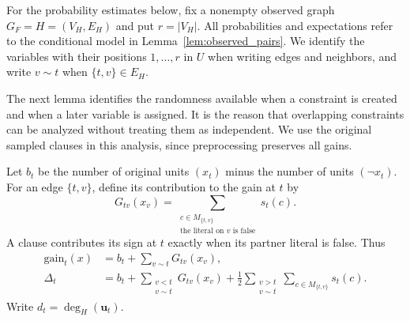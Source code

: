 \documentclass[11pt,a4paper]{article}
\theoremstyle{definition}
\theoremstyle{remark}
\begin{document}
For the probability estimates below, fix a nonempty observed graph
$G_F=H=(V_H,E_H)$ and put $r=|V_H|$. All probabilities and expectations
refer to the conditional model in Lemma~\ref{lem:observed_pairs}.
We identify the variables with their positions $1,\ldots,r$ in $U$
when writing edges and neighbors, and write $v\sim t$ when
$\{t,v\}\in E_H$.

The next lemma identifies the randomness available when a constraint is
created and when a later variable is assigned. It is the reason that
overlapping constraints can be analyzed without treating them as
independent. We use the original sampled clauses in this analysis, since
preprocessing preserves all gains.

Let $b_t$ be the number of original units $(x_t)$ minus the number of
units $(\neg x_t)$. For an edge $\{t,v\}$, define its contribution to
the gain at $t$ by
\[
 G_{tv}(x_v)=
 \sum_{\substack{c\in M_{\{t,v\}}\\
                 \text{the literal on }v\text{ is false}}}s_t(c).
\]
A clause contributes its sign at $t$ exactly when its partner literal
is false. Thus
\begin{align*}
 \mathrm{gain}_t(x)&=b_t+\sum_{v\sim t}G_{tv}(x_v),\\
 \Delta_t&=b_t+\sum_{\substack{v<t\\v\sim t}}G_{tv}(x_v)
       +\frac12\sum_{\substack{v>t\\v\sim t}}\sum_{c\in M_{\{t,v\}}}s_t(c).
\end{align*}
Write $d_t=\deg_H(\mathbf u_t)$.
\end{document}
